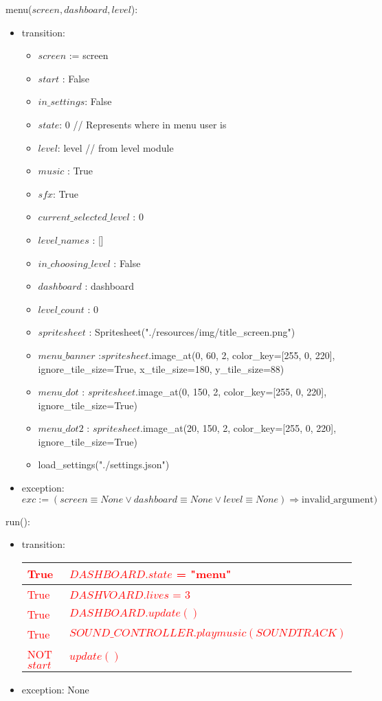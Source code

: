 \documentclass[12pt]{article}
\begin{document}
\noindent menu($\mathit{screen, dashboard, level}$):
\begin{itemize}
\item transition:
\begin{itemize}
    \item $screen$ := screen
    \item $start$ : False
    \item $in\_settings$: False
    \item $state$: 0 // Represents where in menu user is
    \item $level$: level // from level module
    \item $music$ : True
    \item $sfx$: True
    \item $current\_selected\_level$ : 0
    \item $level\_names$ : []
    \item $in\_choosing\_level$ : False
    \item $dashboard$ : dashboard
    \item $level\_count$ : 0
    \item $spritesheet$ : Spritesheet("./resources/img/title\_screen.png")
    \item $menu\_banner$ :$spritesheet$.image\_at(0, 60, 2, color\_key=[255, 0, 220], ignore\_tile\_size=True, x\_tile\_size=180, y\_tile\_size=88)
    \item $menu\_dot$ : $spritesheet$.image\_at(0, 150, 2, color\_key=[255, 0, 220], ignore\_tile\_size=True)
    \item $menu\_dot2$ : $spritesheet$.image\_at(20, 150, 2, color\_key=[255, 0, 220], ignore\_tile\_size=True)
    \item load\_settings("./settings.json")
\end{itemize}
\item exception: $exc := (screen \equiv None \lor dashboard \equiv None \lor level \equiv None) \Rightarrow \text{invalid\_argument})$
\end{itemize}

\noindent run():
\begin{itemize}
    \item transition:
    
\begin{tabular}{|l|l|}
\hline
\textcolor{red}{True} & \textcolor{red}{$DASHBOARD.state$ = "menu"} \\
\hline
\textcolor{red}{True} & \textcolor{red}{$DASHVOARD.lives$ = $3$} \\
\hline
\textcolor{red}{True} & \textcolor{red}{$DASHBOARD.update()$}\\
\hline
\textcolor{red}{True} & \textcolor{red}{$SOUND\_CONTROLLER.playmusic(SOUNDTRACK)$}\\
\hline
\textcolor{red}{NOT $start$} & \textcolor{red}{$update()$}\\
\hline
\end{tabular}

\item exception: None
\end{itemize}
\end{document}
